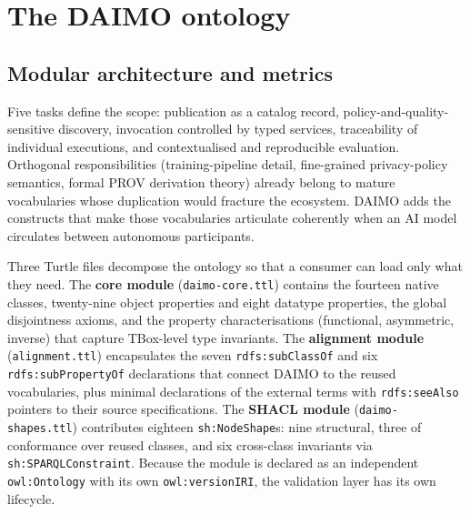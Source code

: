 \documentclass[Afour,sagev,times]{sagej}
\newcommand{\code}[1]{\texttt{#1}}
\begin{document}
\section{The DAIMO ontology}\label{sec:ontology}

\subsection{Modular architecture and metrics}\label{sec:scope}

Five tasks define the scope: publication as a catalog record, policy-and-quality-sensitive discovery, invocation controlled by typed services, traceability of individual executions, and contextualised and reproducible evaluation. Orthogonal responsibilities (training-pipeline detail, fine-grained privacy-policy semantics, formal PROV derivation theory) already belong to mature vocabularies whose duplication would fracture the ecosystem. DAIMO adds the constructs that make those vocabularies articulate coherently when an AI model circulates between autonomous participants.

Three Turtle files decompose the ontology so that a consumer can load only what they need. The \textbf{core module} (\code{daimo-core.ttl}) contains the fourteen native classes, twenty-nine object properties and eight datatype properties, the global disjointness axioms, and the property characterisations (functional, asymmetric, inverse) that capture TBox-level type invariants. The \textbf{alignment module} (\code{alignment.ttl}) encapsulates the seven \code{rdfs:subClassOf} and six \code{rdfs:subPropertyOf} declarations that connect DAIMO to the reused vocabularies, plus minimal declarations of the external terms with \code{rdfs:seeAlso} pointers to their source specifications. The \textbf{SHACL module} (\code{daimo-shapes.ttl}) contributes eighteen \code{sh:NodeShape}s: nine structural, three of conformance over reused classes, and six cross-class invariants via \code{sh:SPARQLConstraint}. Because the module is declared as an independent \code{owl:Ontology} with its own \code{owl:versionIRI}, the validation layer has its own lifecycle.
\end{document}
